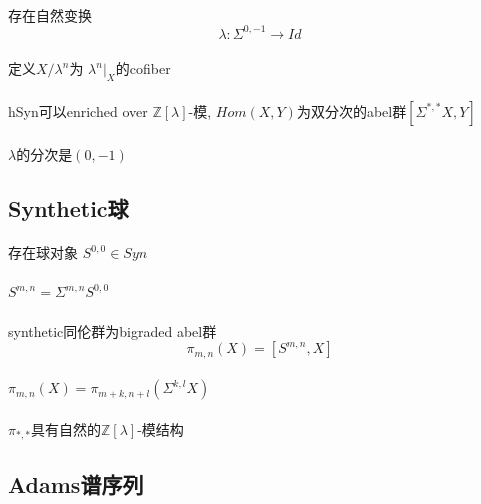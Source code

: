 \documentclass[12pt,a4paper]{article}
\begin{document}
\begin{sloppy}
\paragraph{}存在自然变换
$$\lambda: \Sigma^{0,-1}\xrightarrow{} Id$$

\paragraph{}定义$X/\lambda^n$为 $\lambda^n|_X$的cofiber

\paragraph{} hSyn可以enriched over $\mathbb{Z}[\lambda]$-模, $Hom(X,Y)$为双分次的abel群$[\Sigma^{*,*}X,Y]$

\paragraph{} $\lambda$的分次是$(0,-1)$

\subsection{Synthetic球}
\paragraph{}存在球对象
$S^{0,0}\in Syn$

\paragraph{}
$S^{m,n} = \Sigma^{m,n}S^{0,0}$

\paragraph{}synthetic同伦群为bigraded abel群
$$\pi_{m,n}(X) = [S^{m,n},X]$$

\paragraph{}
$\pi_{m,n}(X) = \pi_{m+k,n+l}(\Sigma^{k,l}X)$

\paragraph{}$\pi_{*,*}$具有自然的$\mathbb{Z}[\lambda]$-模结构

\subsection{Adams谱序列}


\end{sloppy}
\end{document}
